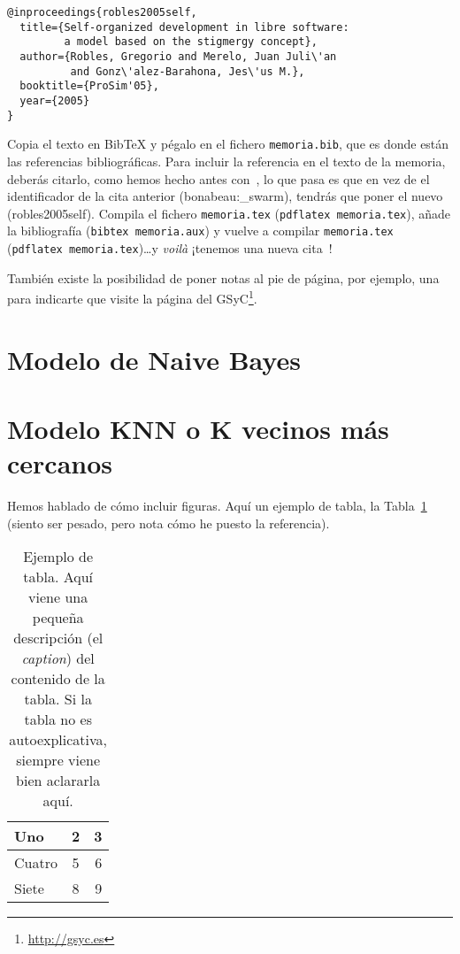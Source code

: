\documentclass[a4paper, 12pt]{book}
\begin{document}
{\footnotesize
\begin{verbatim}
@inproceedings{robles2005self,
  title={Self-organized development in libre software:
         a model based on the stigmergy concept},
  author={Robles, Gregorio and Merelo, Juan Juli\'an 
          and Gonz\'alez-Barahona, Jes\'us M.},
  booktitle={ProSim'05},
  year={2005}
}
\end{verbatim}
}

Copia el texto en BibTeX y pégalo en el fichero \texttt{memoria.bib}, que es donde están las referencias bibliográficas.
Para incluir la referencia en el texto de la memoria, deberás citarlo, como hemos hecho antes con~\cite{bonabeau:_swarm}, lo que pasa es que en vez de el identificador de la cita anterior (bonabeau:\_swarm), tendrás que poner el nuevo (robles2005self).
Compila el fichero \texttt{memoria.tex} (\texttt{pdflatex memoria.tex}), añade la bibliografía (\texttt{bibtex memoria.aux}) y vuelve a compilar \texttt{memoria.tex} (\texttt{pdflatex memoria.tex})\ldots y \emph{voilà} ¡tenemos una nueva cita~\cite{robles2005self}!

También existe la posibilidad de poner notas al pie de página, por ejemplo, una para indicarte que visite la página del GSyC\footnote{\url{http://gsyc.es}}.

\section{Modelo de Naive Bayes} 
\label{sec:modelobayes}

\section{Modelo KNN o K vecinos más cercanos} 
\label{sec:modeloknn}


Hemos hablado de cómo incluir figuras.
Aquí un ejemplo de tabla, la Tabla~\ref{tabla:ejemplo} (siento ser pesado, pero nota cómo he puesto la referencia).

\begin{table}
 \begin{center}
  \begin{tabular}{ | l | c | r |} %
    \hline
    Uno & 2 & 3 \\ \hline %
    Cuatro & 5 & 6 \\ \hline
    Siete & 8 & 9 \\
    \hline
  \end{tabular}
  \label{tabla:ejemplo}
  \caption{Ejemplo de tabla. Aquí viene una pequeña descripción (el \emph{caption}) del contenido de la tabla. Si la tabla no es autoexplicativa, siempre viene bien aclararla aquí.}
 \end{center}
\end{table}
\end{document}
